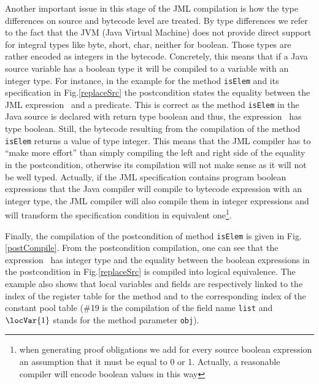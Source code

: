 \begin{enumerate}
Another important issue in this stage of the JML compilation is how the type differences on source and bytecode level are treated. 
By type differences we refer to the fact that the JVM (Java Virtual Machine) does not provide direct support for integral types like byte, short, char, neither for boolean. Those types are rather encoded as integers in the bytecode. Concretely, this means that 
if a Java source variable has a boolean type it will be compiled to a variable with
an integer type. For instance, in the example for the method 
\texttt{isElem} and its specification in Fig.\ref{replaceSrc} the postcondition states the equality between the JML expression  
\result \ and a predicate. This is correct as the method \texttt{isElem} in the Java source is declared with return type boolean  and thus,
 the expression \result \ has type boolean. 
Still, the bytecode resulting from the compilation of the method  \texttt{isElem} returns a value of type integer. This means that the JML compiler has to 
``make more effort'' than simply compiling the left and right side of the equality in the postcondition, otherwise its compilation will not make sense as 
it will not be well typed. Actually, if the JML specification contains program boolean expressions that the Java compiler will compile to bytecode expression
 with an integer type, the JML compiler will also compile them in integer expressions and will transform the specification condition in equivalent 
one\footnote{when generating proof obligations we add for every source boolean expression an assumption that it
 must be equal to 0 or 1. Actually, a reasonable compiler will encode boolean values in this way}.  

Finally, the compilation of the postcondition of method \texttt{isElem} is given in Fig. \ref{postCompile}. From the postcondition compilation,
 one can see that the expression \result \ has integer type and the equality between the boolean expressions in the postcondition in Fig.\ref{replaceSrc} is
 compiled into logical equivalence. The example also 
shows that local variables and  fields are respectively linked to the index of the register table for the method and to the corresponding 
index of the constant pool table 
(\#19 is the compilation of the field name \texttt{list} and $\locVar{1}$ stands for the method parameter \texttt{obj}). 


\end{enumerate}
